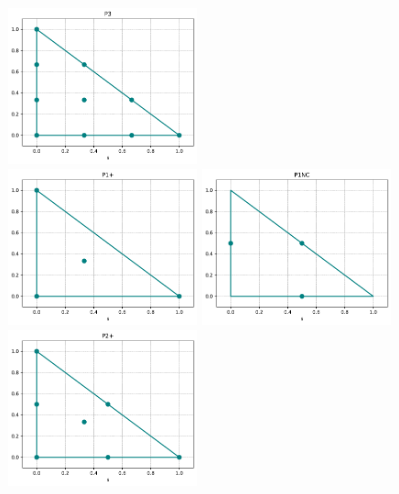 \begin{center}
\includegraphics[width=5cm]{python_codes/fieldstone_120/spaces/P3_nodes}\\
\includegraphics[width=5cm]{python_codes/fieldstone_120/spaces/P1+_nodes}
\includegraphics[width=5cm]{python_codes/fieldstone_120/spaces/P1NC_nodes}
\includegraphics[width=5cm]{python_codes/fieldstone_120/spaces/P2+_nodes}
\end{center}

\newpage

\begin{multicols}{2}


\begin{tiny}

\end{tiny}
\end{multicols}

